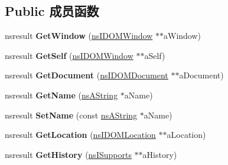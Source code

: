 \subsection*{Public 成员函数}
\begin{DoxyCompactItemize}
\item 
\mbox{\label{interfacens_i_d_o_m_window_afd5bd9cdfdbed4b5edc0b2c99f379cea}} 
nsresult {\bfseries Get\+Window} (\hyperlink{interfacens_i_d_o_m_window}{ns\+I\+D\+O\+M\+Window} $\ast$$\ast$a\+Window)
\item 
\mbox{\label{interfacens_i_d_o_m_window_a73738f88df08971b8cd1d68c9d4c8424}} 
nsresult {\bfseries Get\+Self} (\hyperlink{interfacens_i_d_o_m_window}{ns\+I\+D\+O\+M\+Window} $\ast$$\ast$a\+Self)
\item 
\mbox{\label{interfacens_i_d_o_m_window_a25d50669d71507239e18cee5e948092b}} 
nsresult {\bfseries Get\+Document} (\hyperlink{interfacens_i_d_o_m_document}{ns\+I\+D\+O\+M\+Document} $\ast$$\ast$a\+Document)
\item 
\mbox{\label{interfacens_i_d_o_m_window_a59e90386bb62e8cd88564ea60a1a8000}} 
nsresult {\bfseries Get\+Name} (\hyperlink{structns_string_container}{ns\+A\+String} $\ast$a\+Name)
\item 
\mbox{\label{interfacens_i_d_o_m_window_ac4b8cebbc0e2a27233cbbcaedb7d827c}} 
nsresult {\bfseries Set\+Name} (const \hyperlink{structns_string_container}{ns\+A\+String} $\ast$a\+Name)
\item 
\mbox{\label{interfacens_i_d_o_m_window_a9b13722a7f131dab1715c521234d5b3b}} 
nsresult {\bfseries Get\+Location} (\hyperlink{interfacens_i_d_o_m_location}{ns\+I\+D\+O\+M\+Location} $\ast$$\ast$a\+Location)
\item 
\mbox{\label{interfacens_i_d_o_m_window_a4be243a2faf01799dfd5010e03f93049}} 
nsresult {\bfseries Get\+History} (\hyperlink{interfacens_i_supports}{ns\+I\+Supports} $\ast$$\ast$a\+History)
\item 
\mbox{\label{interfacens_i_d_o_m_window_a1a0a7ae28e84afe7006b64cb5722babd}} 
$$
\end{DoxyCompactItemize}
